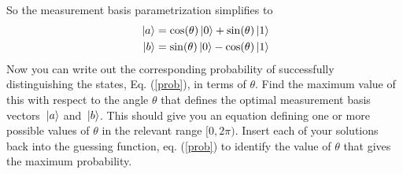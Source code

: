\documentclass[10pt]{article}
\begin{document}
	 So the measurement basis parametrization simplifies to 
	 \begin{align*}
	 \ket*{a} &=  \cos(\theta) \ket*{0} + \sin(\theta) \ket*{1} \\
	 \ket*{b} &= \sin(\theta) \ket*{0} - \cos(\theta) \ket*{1} 
	 \end{align*} 
	 Now you can write out the corresponding probability of successfully distinguishing the states, Eq. 
	 (\ref{prob}), in terms of \( \theta \). Find the maximum value of this with respect to the angle \( \theta \) 
	 that defines the optimal measurement basis vectors \( \ket*{a} \) and \( \ket*{b} \). This should give 
	 you an equation defining one or more possible values of \( \theta \) in the relevant range 
	 \( [0, 2\pi) \). Insert each of your solutions back into the guessing function, 
	 eq. (\ref{prob}) to identify the value of \( \theta \) that gives the maximum probability.

	 \begin{solution}
	 	
	 \end{solution}
	 \pagebreak
\end{document}
